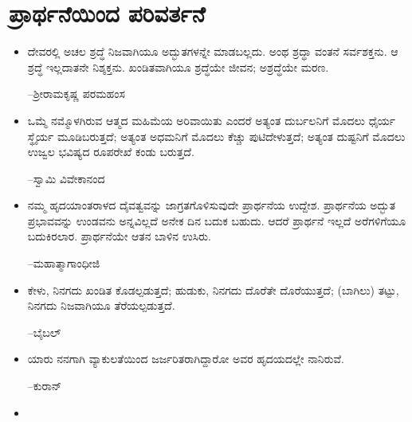 
\chapter{ಪ್ರಾರ್ಥನೆಯಿಂದ ಪರಿವರ್ತನೆ}

\begin{itemize}
\item ದೇವರಲ್ಲಿ ಅಚಲ ಶ್ರದ್ಧೆ ನಿಜವಾಗಿಯೂ ಅದ್ಭುತಗಳನ್ನೇ ಮಾಡಬಲ್ಲದು. ಅಂಥ ಶ್ರದ್ಧಾ ವಂತನೆ ಸರ್ವಶಕ್ತನು. ಆ ಶ್ರದ್ಧೆ ಇಲ್ಲದಾತನೇ ನಿಶ್ಶಕ್ತನು. ಖಂಡಿತವಾಗಿಯೂ ಶ್ರದ್ಧೆಯೇ ಜೀವನ; ಅಶ್ರದ್ಧೆಯೇ ಮರಣ.\\
\begin{flushright}
–ಶ‍್ರೀರಾಮಕೃಷ್ಣ ಪರಮಹಂಸ
\end{flushright}

 \item ಒಮ್ಮೆ ನಮ್ಮೊಳಗಿರುವ ಆತ್ಮದ ಮಹಿಮೆಯ ಅರಿವಾಯಿತು ಎಂದರೆ ಅತ್ಯಂತ ದುರ್ಬಲನಿಗೆ ಮೊದಲು ಧೈರ್ಯ ಸ್ಥೈರ್ಯ ಮೂಡಿಬರುತ್ತದೆ; ಅತ್ಯಂತ ಅಧಮನಿಗೆ ಮೊದಲು ಕೆಚ್ಚು ಪುಟಿದೇಳುತ್ತದೆ; ಅತ್ಯಂತ ದುಷ್ಟನಿಗೆ ಮೊದಲು ಉಜ್ವಲ ಭವಿಷ್ಯದ ರೂಪರೇಖೆ ಕಂಡು ಬರುತ್ತದೆ.\\
\begin{flushright}
–ಸ್ವಾಮಿ ವಿವೇಕಾನಂದ
\end{flushright}

 \item ನಮ್ಮ ಹೃದಯಾಂತರಾಳದ ದೈವತ್ವವನ್ನು ಜಾಗ್ರತಗೊಳಿಸುವುದೇ ಪ್ರಾರ್ಥನೆಯ ಉದ್ದೇಶ. ಪ್ರಾರ್ಥನೆಯ ಅದ್ಭುತ ಪ್ರಭಾವವನ್ನು ಉಂಡವನು ಅನ್ನವಿಲ್ಲದೆ ಅನೇಕ ದಿನ ಬದುಕ ಬಹುದು. ಆದರೆ ಪ್ರಾರ್ಥನೆ ಇಲ್ಲದೆ ಅರೆಗಳಿಗೆಯೂ ಬದುಕಿರಲಾರ. ಪ್ರಾರ್ಥನೆಯೇ ಆತನ ಬಾಳಿನ ಉಸಿರು.\\
\begin{flushright}
–ಮಹಾತ್ಮಾಗಾಂಧೀಜಿ
\end{flushright}

 \item ಕೇಳು, ನಿನಗದು ಖಂಡಿತ ಕೊಡಲ್ಪಡುತ್ತದೆ; ಹುಡುಕು, ನಿನಗದು ದೊರೆತೇ ದೊರೆಯುತ್ತದೆ; (ಬಾಗಿಲು) ತಟ್ಟು, ನಿನಗದು ನಿಜವಾಗಿಯೂ ತೆರೆಯಲ್ಪಡುತ್ತದೆ.\\
\begin{flushright}
–ಬೈಬಲ್​
\end{flushright}

 \item ಯಾರು ನನಗಾಗಿ ವ್ಯಾಕುಲತೆಯಿಂದ ಜರ್ಜರಿತರಾಗಿದ್ದಾರೋ ಅವರ ಹೃದಯದಲ್ಲೇ ನಾನಿರುವೆ.\\
\begin{flushright}
–ಕುರಾನ್​
\end{flushright}

 \item {}\\
\begin{flushright}
\end{flushright}

\end{itemize}


